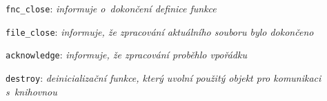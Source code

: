 \begin{myitemize}[itemsep=0pt,partopsep=0pt,parsep=0pt,topsep=0pt,label=\textbullet]
\begin{myitemize}[itemsep=0pt,partopsep=0pt,parsep=0pt,topsep=0pt,label=\textbullet]
\begin{myitemize}
\begin{myitemize}[itemsep=0pt,partopsep=0pt,parsep=0pt,topsep=0pt,label=\textbullet]
\begin{myitemize}[itemsep=0pt,partopsep=0pt,parsep=0pt,topsep=0pt,label=\textbullet]
\begin{myitemize}[itemsep=0pt,partopsep=0pt,parsep=0pt,topsep=0pt,label=\textbullet]
                    \end{myitemize}
                \end{myitemize}
              \item \texttt{fnc\_close}: \textit{informuje o~dokončení definice funkce}
            \end{myitemize}
        \end{myitemize}
      \item \texttt{file\_close}: \textit{informuje, že zpracování aktuálního souboru bylo dokončeno}
    \end{myitemize}
  \item \texttt{acknowledge}: \textit{informuje, že zpracování proběhlo vpořádku}
  \item \texttt{destroy}: \textit{deinicializační funkce, který uvolní použitý objekt pro komunikaci s~knihovnou}
\end{myitemize}

